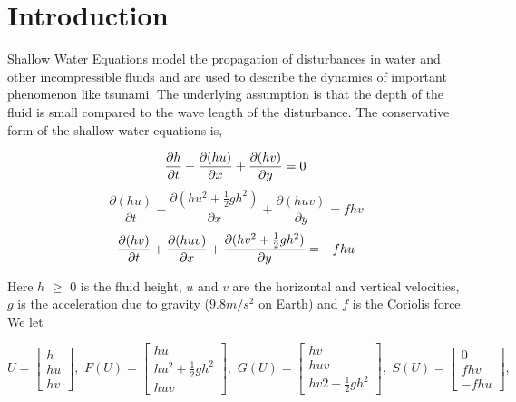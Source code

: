 
\section{Introduction}
\par

Shallow Water Equations model the propagation of disturbances in water and other incompressible fluids and are used to describe the 
dynamics of important phenomenon like tsunami. The underlying assumption is that the depth of the fluid is small compared to 
the wave length of the disturbance. The conservative form of the shallow water equations is,

\begin{equation}\label{eqn:1}
{\frac{\partial h}{\partial t} + \frac{\partial (hu)}{\partial x} + \frac{\partial (hv)}{\partial y} = 0 } \notag
\end{equation}
\begin{equation}
{\frac{\partial (hu)}{\partial t} + \frac{\partial (hu^2 + \frac{1}{2} gh ^2)}{\partial x} + \frac{\partial (huv)}{\partial y} = fhv }
\end{equation}
\begin{equation}
{\frac{\partial (hv)}{\partial t} + \frac{\partial (huv)}{\partial x}+\frac{\partial (hv^2 + \frac{1}{2} gh ^2)}{\partial y}=-fhu } \notag
\end{equation}

Here $h$ $\ge$ 0 is the fluid height, $u$ and $v$ are the horizontal and vertical velocities, $g$ is the acceleration due to gravity ($9.8m/s^2$ on Earth) 
and $f$ is the Coriolis force. We let


\[U = \begin{bmatrix} h \\ hu \\ hv\end{bmatrix},\,\, F(U) = \begin{bmatrix} hu \\ hu^2 +  \frac{1}{2} gh^2 \\ huv \end{bmatrix},\,\,
G(U) = \begin{bmatrix} hv \\ huv \\ hv2 +  \frac{1}{2} gh^2 \end{bmatrix},\,\, 
S(U) = \begin{bmatrix} 0 \\ fhv \\ -fhu \end{bmatrix}, \]


